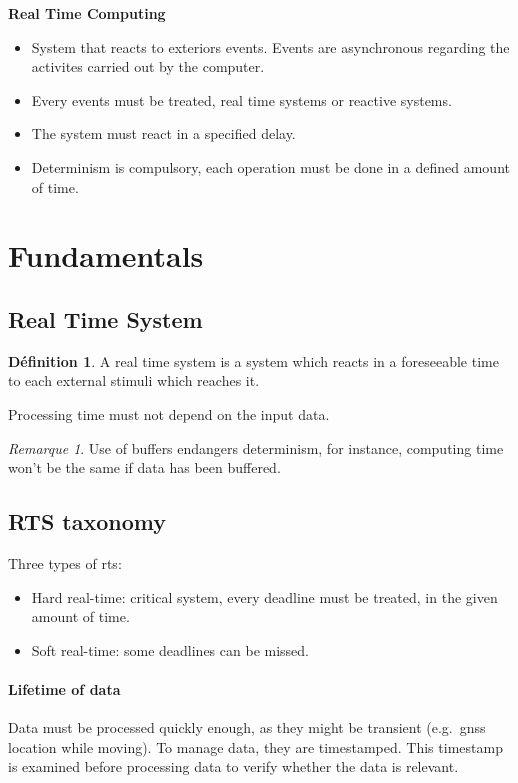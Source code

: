 \documentclass[10pt]{article}
\theoremstyle{plain}
\theoremstyle{definition}
\newtheorem{defn}{Définition}
\theoremstyle{remark}
\newtheorem{rem}{Remarque}
\begin{document}
\begin{center}
    \Large\textbf{Real Time Computing}
\end{center}
\begin{itemize}
    \item System that reacts to exteriors events. Events are
        asynchronous regarding the activites carried out by the computer.
    \item Every events must be treated, real time systems or reactive systems.
    \item The system must react in a specified delay.
    \item Determinism is compulsory, each operation must be done in a defined
        amount of time.
\end{itemize}

\section{Fundamentals}
\subsection{Real Time System}
\begin{defn}
    A real time system is a system which reacts in a foreseeable time to each
    external stimuli which reaches it.

    Processing time must not depend on the input data.
\end{defn}
\begin{rem}
    Use of buffers endangers determinism, for instance, computing time won't be
    the same if data has been buffered.
\end{rem}

\subsection{RTS taxonomy}
Three types of rts:
\begin{itemize}
    \item Hard real-time: critical system, every deadline must be treated, in 
        the given amount of time.
    \item Soft real-time: some deadlines can be missed.
\end{itemize}

\paragraph{Lifetime of data}
Data must be processed quickly enough, as they might be transient (e.g.\ gnss
location while moving). To manage data, they are timestamped. This timestamp is
examined before processing data to verify whether the data is relevant.
\end{document}
